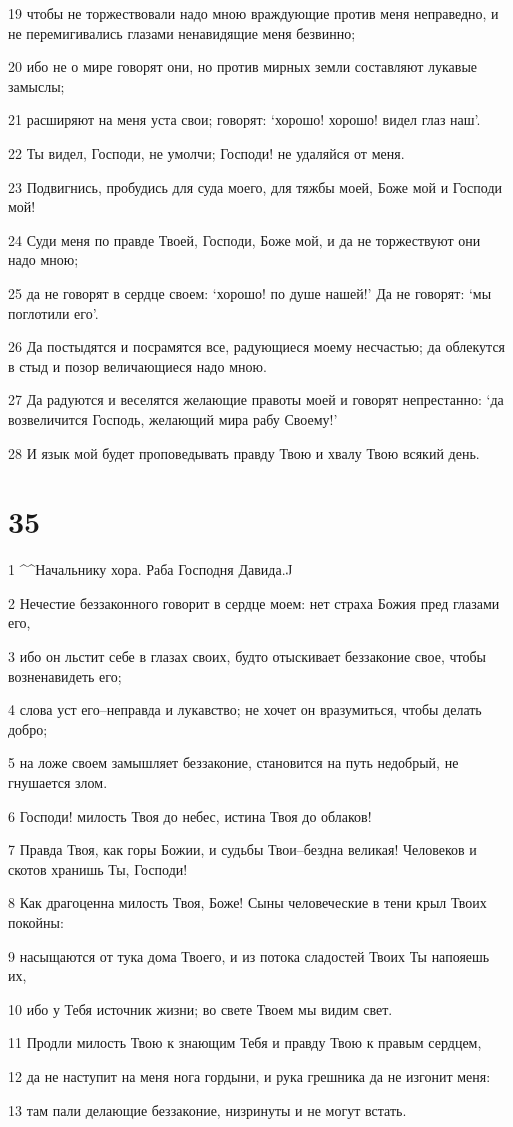 \par 19 чтобы не торжествовали надо мною враждующие против меня неправедно, и не перемигивались глазами ненавидящие меня безвинно;
\par 20 ибо не о мире говорят они, но против мирных земли составляют лукавые замыслы;
\par 21 расширяют на меня уста свои; говорят: `хорошо! хорошо! видел глаз наш'.
\par 22 Ты видел, Господи, не умолчи; Господи! не удаляйся от меня.
\par 23 Подвигнись, пробудись для суда моего, для тяжбы моей, Боже мой и Господи мой!
\par 24 Суди меня по правде Твоей, Господи, Боже мой, и да не торжествуют они надо мною;
\par 25 да не говорят в сердце своем: `хорошо! по душе нашей!' Да не говорят: `мы поглотили его'.
\par 26 Да постыдятся и посрамятся все, радующиеся моему несчастью; да облекутся в стыд и позор величающиеся надо мною.
\par 27 Да радуются и веселятся желающие правоты моей и говорят непрестанно: `да возвеличится Господь, желающий мира рабу Своему!'
\par 28 И язык мой будет проповедывать правду Твою и хвалу Твою всякий день.

\chapter{35}

\par 1 ^^Начальнику хора. Раба Господня Давида.^^
\par 2 Нечестие беззаконного говорит в сердце моем: нет страха Божия пред глазами его,
\par 3 ибо он льстит себе в глазах своих, будто отыскивает беззаконие свое, чтобы возненавидеть его;
\par 4 слова уст его--неправда и лукавство; не хочет он вразумиться, чтобы делать добро;
\par 5 на ложе своем замышляет беззаконие, становится на путь недобрый, не гнушается злом.
\par 6 Господи! милость Твоя до небес, истина Твоя до облаков!
\par 7 Правда Твоя, как горы Божии, и судьбы Твои--бездна великая! Человеков и скотов хранишь Ты, Господи!
\par 8 Как драгоценна милость Твоя, Боже! Сыны человеческие в тени крыл Твоих покойны:
\par 9 насыщаются от тука дома Твоего, и из потока сладостей Твоих Ты напояешь их,
\par 10 ибо у Тебя источник жизни; во свете Твоем мы видим свет.
\par 11 Продли милость Твою к знающим Тебя и правду Твою к правым сердцем,
\par 12 да не наступит на меня нога гордыни, и рука грешника да не изгонит меня:
\par 13 там пали делающие беззаконие, низринуты и не могут встать.

